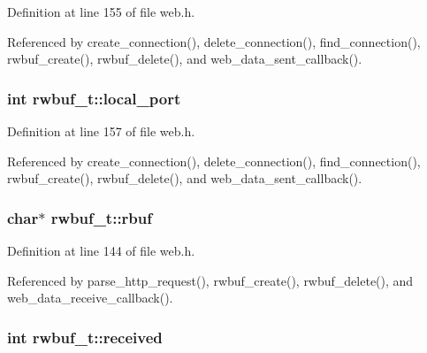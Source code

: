 Definition at line 155 of file web.\+h.



Referenced by create\+\_\+connection(), delete\+\_\+connection(), find\+\_\+connection(), rwbuf\+\_\+create(), rwbuf\+\_\+delete(), and web\+\_\+data\+\_\+sent\+\_\+callback().

\subsubsection[{\texorpdfstring{local\+\_\+port}{local_port}}]{\setlength{\rightskip}{0pt plus 5cm}int rwbuf\+\_\+t\+::local\+\_\+port}\hypertarget{structrwbuf__t_aac758cef289d022f4eb81d4c4fac7f04}{}\label{structrwbuf__t_aac758cef289d022f4eb81d4c4fac7f04}


Definition at line 157 of file web.\+h.



Referenced by create\+\_\+connection(), delete\+\_\+connection(), find\+\_\+connection(), rwbuf\+\_\+create(), rwbuf\+\_\+delete(), and web\+\_\+data\+\_\+sent\+\_\+callback().

\subsubsection[{\texorpdfstring{rbuf}{rbuf}}]{\setlength{\rightskip}{0pt plus 5cm}char$\ast$ rwbuf\+\_\+t\+::rbuf}\hypertarget{structrwbuf__t_afd83372241273849c9395d587b146021}{}\label{structrwbuf__t_afd83372241273849c9395d587b146021}


Definition at line 144 of file web.\+h.



Referenced by parse\+\_\+http\+\_\+request(), rwbuf\+\_\+create(), rwbuf\+\_\+delete(), and web\+\_\+data\+\_\+receive\+\_\+callback().

\subsubsection[{\texorpdfstring{received}{received}}]{\setlength{\rightskip}{0pt plus 5cm}int rwbuf\+\_\+t\+::received}\hypertarget{structrwbuf__t_ac76412a0fbf9dc009ae3f8bb20660883}{}\label{structrwbuf__t_ac76412a0fbf9dc009ae3f8bb20660883}


